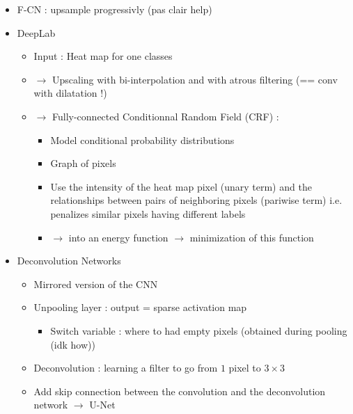 \documentclass{article}
\theoremstyle{plain}%
\theoremstyle{definition}
\theoremstyle{remark}
\begin{document}
\begin{itemize}
    \item F-CN : upsample progressivly (pas clair help)
    \item DeepLab \begin{itemize}
        \item Input : Heat map for one classes 
        \item $\rightarrow$ Upscaling with bi-interpolation and with atrous filtering (== conv with dilatation !)
        \item $\rightarrow$ Fully-connected Conditionnal Random Field (CRF) : \begin{itemize}
            \item Model conditional probability distributions
            \item Graph of pixels
            \item Use the intensity of the heat map pixel (unary term) and the relationships between pairs of neighboring pixels (pariwise term) i.e. penalizes similar pixels having different labels
            \item $\rightarrow$ into an energy function $\rightarrow$ minimization of this function
        \end{itemize}
    \end{itemize}
    \item Deconvolution Networks \begin{itemize}
        \item Mirrored version of the CNN
        \item Unpooling layer : output = sparse activation map \begin{itemize}
            \item Switch variable : where to had empty pixels (obtained during pooling (idk how))
        \end{itemize}
        \item Deconvolution : learning a filter to go from $ 1 $  pixel to $ 3 \times 3 $
        \item Add skip connection between the convolution and the deconvolution network $\rightarrow$ U-Net
    \end{itemize}
\end{itemize}
\end{document}
